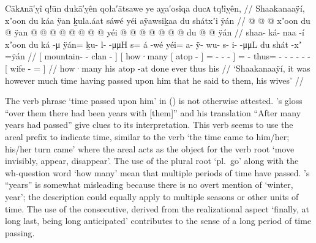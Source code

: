 \ex\label{ex:92-149-time-pass-say-to-wives}%
%
\begingl
	\glpreamble	Cākᴀnā′ỵî q!ūn dukā′ỵên qoła′ātsawe ye aỵa′osîqa ducᴀ tq!îỵên, //
	\glpreamble	Shaakanaaÿí, xʼoon du káa ÿan ḵula.áat sáwé yéi aÿawsiḵaa du shátxʼi ÿán //
	\gla	{}  @ {} @ {} @ {} {}
		{} xʼoon {} du  @ {} {}
			ÿan @  @ {} @ {} @ {} @ {} @ {} {}
		 @ {} @ {}
		yéi @  @ {} @ {} @ {} @ {} @ {} @ {}
		{} du  @ {} @ \•ÿán {} //
	\glb	{} shaa- ká- naa -í {}
		{} xʼoon {} du ká -μ {}
			ÿán= ḵu- {} l-  -μμH {} {}
		s= á -wé
		yéi= a- ÿ- wu- s- i-  -μμL
		{} du shát -xʼ =ÿán {} //
	\glc	{}[ mountain- - clan - {}]
		{}[ how·many {}[  atop - {}]
			= - \· -
				 - \· {}]
		=  -
		thus= - - - - -  -
		{}[  wife - = {}] //
	\gld	{}  {} {} {} {}
		{} how·many {} his atop -at {}
			done  {} {} {} {} {} {}
		ever\·  {}
		thus  {} {} {} {} {} {}
		{} his  {} {} {} //
	\glft	‘Shaakanaaÿí, it was however much time having passed upon him that he said to them, his wives’
		//
\endgl
\xe

The verb phrase  ‘time passed upon him’ in (\lastx) is not otherwise attested.
\citeauthor{swanton:1909}’s gloss “over them there had been years with [them]” and his translation “After many years had passed” give clues to its interpretation.
This verb seems to use the  areal prefix to indicate time, similar to the verb  ‘the time came to him/her; his/her turn came’ where the areal  acts as the object for the verb root  ‘move invisibly, appear, disappear’.
The use of the plural root  ‘pl.\ go’ along with the wh-question word  ‘how many’ mean that multiple periods of time have passed.
\citeauthor{swanton:1909}’s “years” is somewhat misleading because there is no overt mention of  ‘winter, year’; the description could equally apply to multiple seasons or other units of time.
The use of the consecutive, derived from the realizational aspect  ‘finally, at long last, being long anticipated’ contributes to the sense of a long period of time passing.

